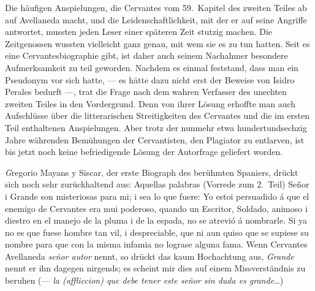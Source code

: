 Die häufigen Anspielungen, die Cervantes vom 59.~Kapitel des
zweiten Teiles ab auf Avellaneda macht, und die Leidenschaftlichkeit,
mit der er auf seine Angriffe antwortet, mussten jeden Leser einer
späteren Zeit stutzig machen. Die Zeitgenossen wussten vielleicht ganz
genau, mit wem sie es zu tun hatten. Seit es eine Cervantesbiographie
gibt, ist daher auch seinem Nachahmer besondere Aufmerksamkeit zu
teil geworden. Nachdem es einmal feststand, dass man ein Pseudonym
vor sich hatte, --- es hätte dazu nicht erst der Beweise von
Isidro Perales
bedurft ---, trat die Frage nach dem wahren Verfasser
des unechten zweiten Teiles in den Vordergrund. Denn von ihrer
Lösung erhoffte man auch Aufschlüsse über die litterarischen Streitigkeiten
des Cervantes und die im ersten Teil enthaltenen Anspielungen. Aber
trotz der nunmehr etwa hundertundsechzig Jahre währenden Bemühungen
der Cervantisten, den Plagiator zu entlarven, ist bis jetzt noch keine
befriedigende Lösung der Autorfrage geliefert worden.

{\emph Gregorio Mayans y Siscar},
der erste Biograph des berühmten Spaniers, drückt sich noch sehr
zurückhaltend aus: {\itquoted Aquellas
palabras {\rm (Vorrede zum 2.~Teil)} Señor i Grande son misteriosas para
mi; i sea lo que fuere: Yo estoi persuadido á que el enemigo de
Cervantes era mui poderoso, quando un Escritor, Soldado, animoso i
diestro en el manejo de la pluma i de la espada, no se atrevió á
nombrarle. Si ya no es que fuese hombre tan vil, i despreciable, que ni
aun quiso que se supiese su nombre para que con la misma infamia
no lograse alguna fama.} Wenn Cervantes Avellaneda {\it señor autor}
nennt, so drückt das kaum Hochachtung aus, {\it Grande} nennt er ihn
dagegen nirgends; es scheint mir dies auf einem Missverständnis zu
beruhen (--- {\it la (affliccion) que debe tener este señor sin duda es grande\dots})

